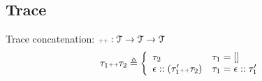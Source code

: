 %
\subsection{Trace}
%
%
%
%
%
%
Trace concatenation: ${\scriptscriptstyle ++}: \mathcal{T} \to \mathcal{T} \to \mathcal{T}$
\[
  \trace_1 \tracecat \trace_2 \triangleq
  \left\{
  \begin{array}{ll} 
    \trace_2                                      & \trace_1 =  [] \\
    \event ::  (\trace_1'  \tracecat \trace_2 )   & \trace_1 =  \event :: \trace_1'\\ 
  \end{array}
  \right.
\]
